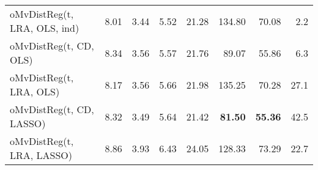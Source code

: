 \begin{tabular}{lrrrrrrr}
oMvDistReg(t, LRA, OLS, ind) & {\cellcolor[HTML]{71FE5F}} \color[HTML]{000000} 8.01 & {\cellcolor[HTML]{38A5FB}} \color[HTML]{F1F1F1} 3.44 & {\cellcolor[HTML]{36215F}} \color[HTML]{F1F1F1} 5.52 & {\cellcolor[HTML]{20C7DF}} \color[HTML]{000000} 21.28 & {\cellcolor[HTML]{A71401}} \color[HTML]{F1F1F1} 134.80 & {\cellcolor[HTML]{CDEC34}} \color[HTML]{000000} 70.08 & {\cellcolor[HTML]{3D358B}} \color[HTML]{F1F1F1} 2.2 \\
oMvDistReg(t, CD, OLS) & {\cellcolor[HTML]{F9BC39}} \color[HTML]{000000} 8.34 & {\cellcolor[HTML]{4EF97D}} \color[HTML]{000000} 3.56 & {\cellcolor[HTML]{4249B1}} \color[HTML]{F1F1F1} 5.57 & {\cellcolor[HTML]{46F884}} \color[HTML]{000000} 21.76 & {\cellcolor[HTML]{4771E9}} \color[HTML]{F1F1F1} 89.07 & {\cellcolor[HTML]{351E58}} \color[HTML]{F1F1F1} 55.86 & {\cellcolor[HTML]{4776EE}} \color[HTML]{F1F1F1} 6.3 \\
oMvDistReg(t, LRA, OLS) & {\cellcolor[HTML]{BEF434}} \color[HTML]{000000} 8.17 & {\cellcolor[HTML]{46F884}} \color[HTML]{000000} 3.56 & {\cellcolor[HTML]{467DF4}} \color[HTML]{F1F1F1} 5.66 & {\cellcolor[HTML]{80FF53}} \color[HTML]{000000} 21.98 & {\cellcolor[HTML]{A11201}} \color[HTML]{F1F1F1} 135.25 & {\cellcolor[HTML]{D2E935}} \color[HTML]{000000} 70.28 & {\cellcolor[HTML]{F2C93A}} \color[HTML]{000000} 27.1 \\
oMvDistReg(t, CD, LASSO) & {\cellcolor[HTML]{F5C53A}} \color[HTML]{000000} 8.32 & {\cellcolor[HTML]{18D7CA}} \color[HTML]{000000} 3.49 & {\cellcolor[HTML]{4771E9}} \color[HTML]{F1F1F1} 5.64 & {\cellcolor[HTML]{18DBC5}} \color[HTML]{000000} 21.42 & {\cellcolor[HTML]{30123B}} \color[HTML]{F1F1F1} \bfseries 81.50 & {\cellcolor[HTML]{30123B}} \color[HTML]{F1F1F1} \bfseries 55.36 & {\cellcolor[HTML]{7A0403}} \color[HTML]{F1F1F1} 42.5 \\
oMvDistReg(t, LRA, LASSO) & {\cellcolor[HTML]{7A0403}} \color[HTML]{F1F1F1} 8.86 & {\cellcolor[HTML]{7A0403}} \color[HTML]{F1F1F1} 3.93 & {\cellcolor[HTML]{C82803}} \color[HTML]{F1F1F1} 6.43 & {\cellcolor[HTML]{7A0403}} \color[HTML]{F1F1F1} 24.05 & {\cellcolor[HTML]{E5470B}} \color[HTML]{F1F1F1} 128.33 & {\cellcolor[HTML]{FDAE35}} \color[HTML]{000000} 73.29 & {\cellcolor[HTML]{B9F635}} \color[HTML]{000000} 22.7 \\
\bottomrule
\end{tabular}
